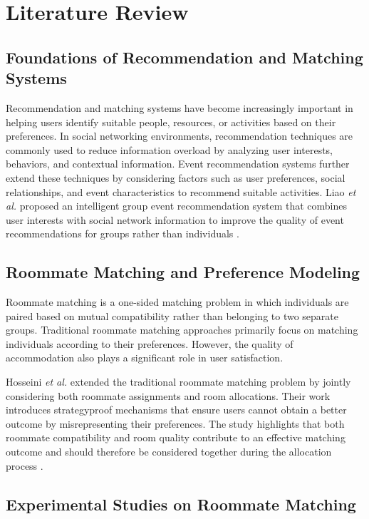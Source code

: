 \section{Literature Review}

\subsection{Foundations of Recommendation and Matching Systems}

Recommendation and matching systems have become increasingly important in helping users identify suitable people, resources, or activities based on their preferences. In social networking environments, recommendation techniques are commonly used to reduce information overload by analyzing user interests, behaviors, and contextual information. Event recommendation systems further extend these techniques by considering factors such as user preferences, social relationships, and event characteristics to recommend suitable activities. Liao \textit{et al.} proposed an intelligent group event recommendation system that combines user interests with social network information to improve the quality of event recommendations for groups rather than individuals \cite{liao2016}.

\subsection{Roommate Matching and Preference Modeling}

Roommate matching is a one-sided matching problem in which individuals are paired based on mutual compatibility rather than belonging to two separate groups. Traditional roommate matching approaches primarily focus on matching individuals according to their preferences. However, the quality of accommodation also plays a significant role in user satisfaction.

Hosseini \textit{et al.} extended the traditional roommate matching problem by jointly considering both roommate assignments and room allocations. Their work introduces strategyproof mechanisms that ensure users cannot obtain a better outcome by misrepresenting their preferences. The study highlights that both roommate compatibility and room quality contribute to an effective matching outcome and should therefore be considered together during the allocation process \cite{hosseini2025}.

\subsection{Experimental Studies on Roommate Matching}

